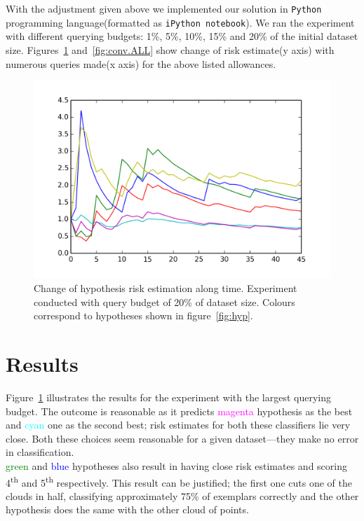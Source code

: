 \documentclass[12pt, a4paper, pdflatex, leqno, twoside]{report}
\newcommand{\ts}{\textsuperscript}
\begin{document}
With the adjustment given above we implemented our solution in \texttt{Python} 
programming language(formatted as \texttt{iPython notebook}). We ran the 
experiment with different querying budgets: 1\%, 5\%, 10\%, 15\% and 20\% of 
the initial dataset size. Figures~\ref{fig:conv} and~\ref{fig:conv.ALL} show change 
of risk estimate(y axis) with numerous queries made(x axis) for the above listed allowances.\\


\begin{figure}[htbp]
  \centering
  \includegraphics[width=0.7\linewidth]{graphics/convergence.png}
  \begin{tiny}
    \caption{Change of hypothesis risk estimation along time. Experiment 
conducted with query budget of 20\% of dataset size. Colours correspond to 
hypotheses shown in figure~\ref{fig:hyp}.\label{fig:conv}}
  \end{tiny}
  \vspace{1cm}
\end{figure}

\section{Results}
Figure~\ref{fig:conv} illustrates the results for the experiment with the largest 
querying budget. The outcome is reasonable as it predicts 
\textcolor{magenta}{magenta} hypothesis as the best and \textcolor{cyan}{cyan} 
one as the second best; risk estimates for both these classifiers lie very 
close. Both these choices seem reasonable for a given dataset---they make no 
error in classification.\\
\textcolor{green}{green} and \textcolor{blue}{blue} hypotheses also result in  
having close risk estimates and scoring 4\ts{th} and 5\ts{th} respectively. 
This result can be justified; the first one cuts one of the clouds in half, 
classifying approximately 75\% of exemplars correctly and the other hypothesis 
does the same with the other cloud of points.\\
\end{document}
